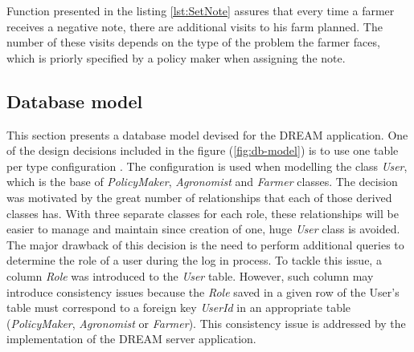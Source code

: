 Function presented in the listing \ref{lst:SetNote} assures that every time a farmer receives a negative note, there are additional visits to his farm planned. The number of these visits depends on the type of the problem the farmer faces, which is priorly specified by a policy maker when assigning the note.



\subsection{Database model}

This section presents a database model devised for the DREAM application. One of the design decisions included in the figure (\ref{fig:db-model}) is to use one table per type configuration \cite{ef-Inheritance}. The configuration is used when modelling the class \textit{User}, which is the base of \textit{PolicyMaker}, \textit{Agronomist} and \textit{Farmer} classes. The decision was motivated by the great number of relationships that each of those derived classes has. With three separate classes for each role, these relationships will be easier to manage and maintain since creation of one, huge \textit{User} class is avoided. The major drawback of this decision is the need to perform additional queries to determine the role of a user during the log in process. To tackle this issue, a column \textit{Role} was introduced to the \textit{User} table. However, such column may introduce consistency issues because the \textit{Role} saved in a given row of the User's table must correspond to a foreign key \textit{UserId} in an appropriate table (\textit{PolicyMaker}, \textit{Agronomist} or \textit{Farmer}). This consistency issue is addressed by the implementation of the DREAM server application.


